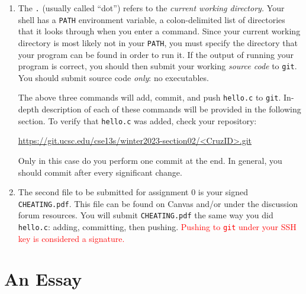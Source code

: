 \documentclass[11pt]{article}
\begin{document}
\begin{enumerate}
\begin{shlisting}{}
  $ ls
\end{shlisting}

    To run the \texttt{hello} program, enter:

\begin{shlisting}{}
  $ ./hello
\end{shlisting}

  \item The \texttt{.} (usually called ``dot'') refers to the \emph{current
    working directory.} Your shell has a \texttt{PATH} environment variable, a
    colon-delimited list of directories that it looks through when you enter a
    command. Since your current working directory is most likely not in your
    \texttt{PATH}, you must specify the directory that your program can be found
    in order to run it. If the output of running your program is correct, you
    should then submit your working \emph{source code} to \texttt{git}. You
    should submit source code \emph{only}: no executables.


    The above three commands will add, commit, and push \texttt{hello.c} to
    \texttt{git}. In-depth description of each of these commands will be
    provided in the following section. To verify that \texttt{hello.c} was
    added, check your repository:

    \vspace\baselineskip
    \centerline{\url{https://git.ucsc.edu/cse13s/winter2023-section02/<CruzID>.git}}
    \vspace\baselineskip

    Only in this case do you perform one commit at the end. In general, you
    should commit after every significant change.

  \item The second file to be submitted for assignment 0 is your signed
    \texttt{CHEATING.pdf}. This file can be found on Canvas and/or under the discussion forum
    resources.
 You will submit
    \texttt{CHEATING.pdf} the same way you did \texttt{hello.c}: adding,
    committing, then pushing.
\textcolor{red}{Pushing to \texttt{git} under your SSH key is considered a signature.}
\end{enumerate}

\section{An Essay}
\end{document}
